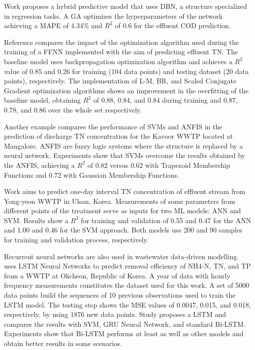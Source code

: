 Work \cite{Niu2020} proposes a hybrid predictive model that uses \ac{DBN}, a  structure specialized in regression tasks. A \ac{GA} optimizes the hyperparameters of the network achieving a \ac{MAPE} of 4.34\% and \begin{math}R^2\end{math} of 0.6 for the effluent \ac{COD} prediction.

Reference \cite{Zhao2021} compares the impact of the optimization algorithm used during the training of a \ac{FFNN} implemented with the aim of predicting effluent \ac{TN}. The baseline model uses backpropagation optimization algorithm and achieves a \begin{math}R^2\end{math} value of 0.85 and 0.26 for training (104 data points) and testing dataset (20 data points), respectively. The implementation of \ac{L-M}, \ac{BR}, and Scaled Conjugate Gradient optimization algorithms shows an improvement in the overfitting of the baseline model, obtaining \begin{math}R^2\end{math} of 0.88, 0.84, and 0.84 during training and 0.87, 0.78, and 0.86 over the whole set respectively.

Another example \cite{Manu2017} compares the performance of  \ac{SVM}s and \ac{ANFIS} in the prediction of discharge \ac{TN} concentration for the Kavoor \ac{WWTP} located at Mangalore. \ac{ANFIS} are fuzzy logic systems where the structure is replaced by a neural network. Experiments show that \ac{SVM}s overcome the results obtained by the \ac{ANFIS}, achieving a \begin{math}R^2\end{math} of 0.82 versus 0.62 with Trapezoid Membership Functions and 0.72 with Gaussian Membership Functions. 

Work \cite{Guo2015} aims to predict one-day interval \ac{TN} concentration of effluent stream from Yong-yeon \ac{WWTP} in Ulsan, Korea. Measurements of some parameters from different points of the treatment serve as inputs for two \ac{ML} models: \ac{ANN} and \ac{SVM}. Results show a \begin{math}R^2\end{math} for training and validation of 0.55 and 0.47 for the \ac{ANN} and 1.00 and 0.46 for the \ac{SVM} approach. Both models use 200 and 90 samples for training and validation process, respectively.

Recurrent neural networks are also used in wastewater data-driven modelling. \cite{Yaqub2020} uses \ac{LSTM} Neural Networks to predict removal efficiency of NH4-N, \ac{TN}, and \ac{TP} from a \ac{WWTP} at Okcheon, Republic of Korea. A year of data with hourly frequency measurements constitutes the dataset used for this work. A set of 5000 data points build the sequences of 10 previous observations used to train the  \ac{LSTM} model. The testing step shows the \ac{MSE} values of 0.0047, 0.015, and 0.018, respectively, by using 1876 new data points. Study \cite{Kang2020} proposes a \ac{LSTM} and compares the results with \ac{SVM}, \ac{GRU} Neural Network, and standard  \ac{Bi-LSTM}. Experiments show that \ac{Bi-LSTM} performs at least as well as other models and obtain better results in some scenarios.

